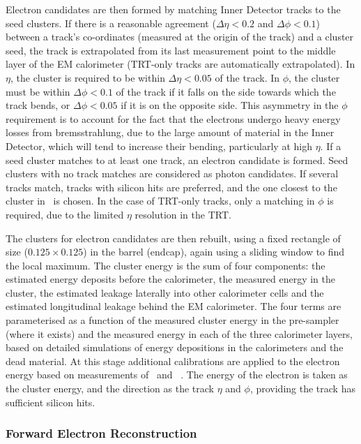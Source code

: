Electron candidates are then formed by matching Inner Detector tracks to the
seed clusters. If there is a reasonable agreement ($\Delta \eta <0.2$ and
$\Delta \phi <0.1$) between a track's co-ordinates (measured at the origin of the
track) and a cluster seed, the track is extrapolated from its last measurement point to
the middle layer of the EM calorimeter (TRT-only tracks are automatically
extrapolated). In $\eta$, the cluster is required to be within 
$\Delta \eta <0.05$ of the track. In $\phi$, the cluster must be within $\Delta \phi < 0.1$ of
the track if it falls on the side towards which the track bends, or $\Delta
\phi < 0.05$ if it is on the opposite side. This asymmetry in the $\phi$
requirement is to
account for the fact that the electrons undergo heavy energy losses from
bremsstrahlung, due to the large amount of material in the Inner Detector, which
will tend to increase their bending,
particularly at high $\eta$. If a seed cluster matches to at least one track,
an electron candidate is formed. Seed clusters with no track matches are
considered as photon candidates. If several tracks match, tracks with
silicon hits are preferred, and the one closest to the cluster in \deltaR\ 
is chosen. In the case of TRT-only tracks, only a matching in $\phi$ is required, 
due to the limited $\eta$ resolution in the TRT.

The clusters for electron candidates are then rebuilt, using a fixed rectangle of size 
\deltaetadeltaphi{0.075}{0.175} ($0.125 \times 0.125$) in the barrel (endcap),
again using a sliding window to find the local maximum. The cluster energy is
the sum of four components: the estimated energy deposits before the
calorimeter, the measured energy in the cluster, the estimated leakage laterally
into other calorimeter cells and the estimated longitudinal leakage behind the
EM calorimeter. The four terms are parameterised as a function of the measured
cluster energy in the pre-sampler (where it exists) and the measured energy in each of the three
calorimeter layers, based on detailed simulations of energy depositions in the
calorimeters and the dead material. At this stage additional calibrations are
applied to the electron energy based on measurements of \Zee\ and
\JPsiee~\cite{Aad:2011mk}. The energy of the electron is taken as the cluster
energy, and the direction as the track $\eta$ and $\phi$, providing the track
has sufficient silicon hits.

\subsubsection{Forward Electron Reconstruction}

